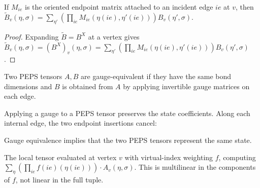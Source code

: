 \begin{theorem}%
    \label{thm:peps_absorbEdgeGauges_component}
    \leanok
    If $M_{ie}$ is the oriented endpoint matrix attached to an incident edge
    $ie$ at $v$, then
    $\widetilde B_v(\eta,\sigma)=
        \sum_{\eta'}(\prod_{ie}M_{ie}(\eta(ie),\eta'(ie)))B_v(\eta',\sigma)$.
\end{theorem}
\begin{proof}\leanok
    Expanding $\widetilde B=B^X$ at a vertex gives
    $\widetilde B_v(\eta,\sigma)=(B^X)_v(\eta,\sigma)=
        \sum_{\eta'}(\prod_{ie}M_{ie}(\eta(ie),\eta'(ie)))B_v(\eta',\sigma)$.
\end{proof}

\begin{definition}%
    \label{def:GaugeEquivPEPS}
    \leanok
    Two PEPS tensors $A, B$ are gauge-equivalent if they have the same bond
    dimensions and $B$ is obtained from $A$ by applying invertible gauge
    matrices on each edge.
\end{definition}

\begin{theorem}%
    \label{thm:applyGauge_stateCoeff}
    \leanok
    Applying a gauge to a PEPS tensor preserves the state coefficients.
    Along each internal edge, the two endpoint insertions cancel:
    \begin{center}
        \TNPEPSGaugeCancellation
    \end{center}
\end{theorem}

\begin{theorem}%
    \label{thm:GaugeEquiv_sameState}
    \leanok
    Gauge equivalence implies that the two PEPS tensors represent the same state.
\end{theorem}

\begin{definition}%
    \label{def:localTensorEval}
    \leanok
    The local tensor evaluated at vertex $v$ with virtual-index weighting $f$,
    computing $\sum_\eta (\prod_{ie} f(ie)(\eta(ie))) \cdot A_v(\eta, \sigma)$.
    This is multilinear in the components of $f$, not linear in the full tuple.
\end{definition}

